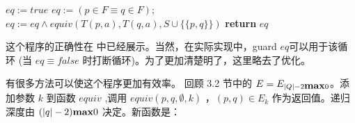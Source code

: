\begin{algorithm}
    \small
    \begin{algorithmic}[1]
                $eq := true$
                \State $ eq := ( p \in F \equiv q \in F ) $;
                    \State $eq:= eq \land equiv ( T(p,a),T(q,a),S\cup \{ \{ p,q\} \}  ) $
                \EndFor
            \EndIf
            \State \textbf{return} $eq$
        \EndFunction
    \end{algorithmic}
\end{algorithm}
这个程序的正确性在 \cite{t-Ei91} 中已经展示。当然，在实际实现中，guard $eq$可以用于该循环 (当 $eq \equiv false$ 时打断循环)。为了更加清楚明了，这里略去了优化。

有很多方法可以使这个程序更加有效率。 回顾 3.2 节中的 $ E = E_{ |Q|-2 \mbox{\textbf{max}} 0 } $。添加参数 $k$ 到函数 $equiv$ ,调用 $equiv(p,q,\emptyset,k)$ ，$ (p,q) \in E_k $ 作为返回值。递归深度由 $ (|q|-2) \mbox{\textbf{max}} 0 $ 决定。新函数是：

